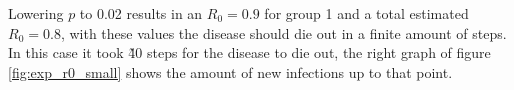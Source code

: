 
Lowering $p$ to 0.02 results in an $R_0=0.9$ for group 1 and a total estimated $R_0=0.8$, with these values the disease should die out in a finite amount of steps. In this case it took \~40 steps for the disease to die out, the right graph of figure \ref{fig:exp_r0_small} shows the amount of new infections up to that point.

